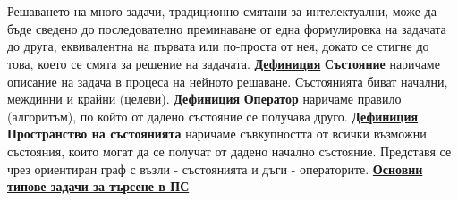\documentclass{article}
\begin{document}
\section*{\centering \color{bordeaux}{Изкуствен интелект}}

\subsection*{\color{bordeaux}{25. Търсене в пространството от състояния. Генетични алгоритми.}}

Решаването на много задачи, традиционно смятани за интелектуални, може да бъде сведено до последователно преминаване от една формулировка на
задачата до друга, еквивалентна на първата или по-проста от нея, докато се стигне до това, което се смята за решение на задачата. \newline\newline
\textbf{\underline{Дефиниция}}
\textbf{Състояние} наричаме описание на задача в процеса на нейното решаване. Състоянията биват начални,
междинни и крайни (целеви). \newline\newline
\textbf{\underline{Дефиниция}}
\textbf{Оператор} наричаме правило (алгоритъм), по който от дадено състояние се получава друго. \newline\newline
\textbf{\underline{Дефиниция}}
\textbf{Пространство на състоянията} наричаме съвкупността от всички възможни състояния, които могат да се получат от дадено начално състояние.
Представя се чрез ориентиран граф с възли - състоянията и дъги - операторите. \newline\newline
\textbf{\underline{Основни типове задачи за търсене в ПС}}
\end{document}
